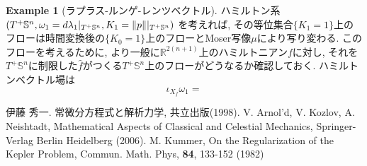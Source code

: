 \documentclass[a4paper]{ujarticle}
\numberwithin{equation}{section}
\theoremstyle{definition}
\newtheorem{example}{Example}
\begin{document}
\begin{example}[ラプラス-ルンゲ-レンツベクトル]
            ハミルトン系$(T^{+}\mathbb{S}^{n}, \omega_1 = d \lambda_1|_{T^{+} \mathbb{S}^{n}}, K_1 = \norm{p}|_{T^{+} \mathbb{S}^n})$
            を考えれば, その等位集合$\{K_1 = 1\}$上のフローは時間変換後の$\{K_0 = 1\}$上のフローとMoser写像$\mu$により写り変わる.
            このフローを考えるために, より一般に$\mathbb{R}^{2(n+1)}$上のハミルトニアン$f$に対し, 
            それを$T^{+} \mathbb{S}^{n}$に制限した$\hat{f}$がつくる$T^{+} \mathbb{S}^{n}$上のフローがどうなるか確認しておく.
            ハミルトンベクトル場は
            \[
                \iota_{X_f}\omega_1 = 
            \]
        \end{example}
    \begin{thebibliography}{10}
    \nocite{*}
	 伊藤 秀一. 常微分方程式と解析力学, 共立出版(1998).
     V. Arnol'd, V. Kozlov, A. Neishtadt, Mathematical Aspects of Classical and Celestial Mechanics, Springer-Verlag Berlin Heidelberg (2006).
     M. Kummer, On the Regularization of the Kepler Problem, Commun. Math. Phys, \textbf{84}, 133-152 (1982)
\end{thebibliography}
\end{document}
